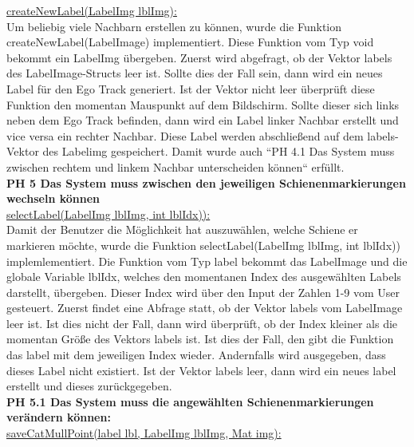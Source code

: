 \noindent
\underline{createNewLabel(LabelImg lblImg):}
\\

\noindent
Um beliebig viele Nachbarn erstellen zu können, wurde die Funktion createNewLabel(LabelImage) implementiert. Diese Funktion vom Typ void bekommt ein LabelImg übergeben. Zuerst wird abgefragt, ob der Vektor labels des LabelImage-Structs leer ist. Sollte dies der Fall sein, dann wird ein neues Label für den Ego Track generiert. Ist der Vektor nicht leer überprüft diese Funktion den momentan Mauspunkt auf dem Bildschirm. Sollte dieser sich links neben dem Ego Track befinden, dann wird ein Label linker Nachbar erstellt und vice versa ein rechter Nachbar. Diese Label werden abschließend auf dem labels-Vektor des Labelimg gespeichert. Damit wurde auch ``PH 4.1 Das System muss zwischen rechtem und linkem Nachbar unterscheiden können`` erfüllt.
\\

\noindent
\textbf {PH 5 Das System muss zwischen den jeweiligen Schienenmarkierungen wechseln können}
\\

\noindent
\underline{selectLabel(LabelImg lblImg, int lblIdx)):}
\\

\noindent
Damit der Benutzer die Möglichkeit hat auszuwählen, welche Schiene er markieren möchte, wurde die Funktion selectLabel(LabelImg lblImg, int lblIdx)) implemlementiert. Die Funktion vom Typ label bekommt das LabelImage und die globale Variable lblIdx, welches den momentanen Index des ausgewählten Labels darstellt, übergeben. Dieser Index wird über den Input der Zahlen 
1-9 vom User gesteuert. Zuerst findet eine Abfrage statt, ob der Vektor labels vom LabelImage leer ist. Ist dies nicht der Fall, dann wird überprüft, ob der Index kleiner als die momentan Größe des Vektors labels ist. Ist dies der Fall, den gibt die Funktion das label mit dem jeweiligen Index wieder. Andernfalls wird ausgegeben, dass dieses Label nicht existiert. Ist der Vektor labels leer, dann wird ein neues label erstellt und dieses zurückgegeben.
\\

\noindent
\textbf {PH 5.1 Das System muss die angewählten Schienenmarkierungen verändern können:}
\\

\noindent
\underline{saveCatMullPoint(label lbl, LabelImg lblImg, Mat img):}
\\

